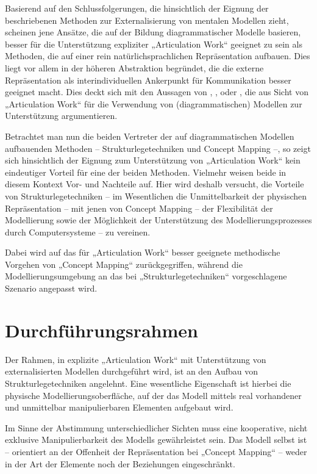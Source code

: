 Basierend auf den Schlussfolgerungen, die \citet{Ifenthaler06} hinsichtlich der Eignung der beschriebenen Methoden zur Externalisierung von mentalen Modellen zieht, scheinen jene Ansätze, die auf der Bildung diagrammatischer Modelle basieren, besser für die Unterstützung expliziter „Articulation Work“ geeignet zu sein als Methoden, die auf einer rein natürlichsprachlichen Repräsentation aufbauen. Dies liegt vor allem in der höheren Abstraktion begründet, die die externe Repräsentation als interindividuellen Ankerpunkt für Kommunikation besser geeignet macht. Dies deckt sich mit den Aussagen von  \citet{Sarini02}, \citet{Herrmann02}, \citet{Raposo04} oder \citet{Jorgensen04}, die aus Sicht von „Articulation Work“ für die Verwendung von (diagrammatischen) Modellen zur Unterstützung argumentieren.

Betrachtet man nun die beiden Vertreter der auf diagrammatischen Modellen aufbauenden Methoden -- Strukturlegetechniken und Concept Mapping --, so zeigt sich hinsichtlich der Eignung zum Unterstützung von „Articulation Work“ kein eindeutiger Vorteil für eine der beiden Methoden. Vielmehr weisen beide in diesem Kontext Vor- und Nachteile auf. Hier wird deshalb versucht, die Vorteile von Strukturlegetechniken -- im Wesentlichen die Unmittelbarkeit der physischen Repräsentation -- mit jenen von Concept Mapping -- der Flexibilität der Modellierung sowie der Möglichkeit der Unterstützung des Modellierungsprozesses durch Computersysteme -- zu vereinen.

Dabei wird auf das für „Articulation Work“ besser geeignete methodische Vorgehen von „Concept Mapping“ zurückgegriffen, während die Modellierungsumgebung an das bei „Strukturlegetechniken“ vorgeschlagene Szenario angepasst wird.

\section{Durchführungsrahmen} %
\label{sec:durchführungsrahmen}

Der Rahmen, in explizite „Articulation Work“ mit Unterstützung von externalisierten Modellen durchgeführt wird, ist an den Aufbau von Strukturlegetechniken angelehnt. Eine wesentliche Eigenschaft ist hierbei die physische Modellierungsoberfläche, auf der das Modell mittels real vorhandener und unmittelbar manipulierbaren Elementen aufgebaut wird. 

Im Sinne der Abstimmung unterschiedlicher Sichten muss eine kooperative, nicht exklusive Manipulierbarkeit des Modells gewährleistet sein. Das Modell selbst ist -- orientiert an der Offenheit der Repräsentation bei „Concept Mapping“ -- weder in der Art der Elemente noch der Beziehungen eingeschränkt. 


